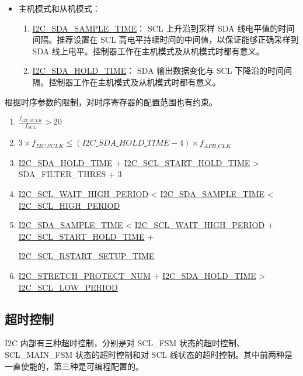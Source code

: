 \documentclass[main\_\_CN.tex]{subfiles}
\begin{document}
\begin{itemize}
\item 主机模式和从机模式：

\begin{enumerate}

\item \hyperref[fielddesc:I2CSDASAMPLETIME]{I2C\_SDA\_SAMPLE\_TIME}：
SCL 上升沿到采样 SDA 线电平值的时间间隔。推荐设置在 SCL 高电平持续时间的中间值，以保证能够正确采样到 SDA 线上电平。控制器工作在主机模式及从机模式时都有意义。

\item \hyperref[fielddesc:I2CSDAHOLDTIME]{I2C\_SDA\_HOLD\_TIME}：
SDA 输出数据变化与 SCL 下降沿的时间间隔。控制器工作在主机模式及从机模式时都有意义。

\end{enumerate}

\end{itemize}

根据时序参数的限制，对时序寄存器的配置范围也有约束。
\begin{enumerate}
\item $\frac{f_{I2C\_SCLK}}{f_{SCL}} > 20$
\item $3 \times f_{I2C\_SCLK} \leq (\hyperref[fielddesc:I2CSDAHOLDTIME]{I2C\_SDA\_HOLD\_TIME}-4) \times f_{APB\_CLK}$
\item \hyperref[fielddesc:I2CSDAHOLDTIME]{I2C\_SDA\_HOLD\_TIME} + \hyperref[fielddesc:I2CSCLSTARTHOLDTIME]{I2C\_SCL\_START\_HOLD\_TIME} > SDA\_FILTER\_THRES + 3
\item \hyperref[fielddesc:I2CSCLWAITHIGHPERIOD]{I2C\_SCL\_WAIT\_HIGH\_PERIOD} < \hyperref[fielddesc:I2CSDASAMPLETIME]{I2C\_SDA\_SAMPLE\_TIME} < \hyperref[fielddesc:I2CSCLHIGHPERIOD]{I2C\_SCL\_HIGH\_PERIOD}
\item \hyperref[fielddesc:I2CSDASAMPLETIME]{I2C\_SDA\_SAMPLE\_TIME} < \hyperref[fielddesc:I2CSCLWAITHIGHPERIOD]{I2C\_SCL\_WAIT\_HIGH\_PERIOD} + \hyperref[fielddesc:I2CSCLSTARTHOLDTIME]{I2C\_SCL\_START\_HOLD\_TIME} +

\hyperref[fielddesc:I2CSCLRSTARTSETUPTIME]{I2C\_SCL\_RSTART\_SETUP\_TIME}
\item \hyperref[fielddesc:I2CSTRETCHPROTECTNUM]{I2C\_STRETCH\_PROTECT\_NUM} + \hyperref[fielddesc:I2CSDAHOLDTIME]{I2C\_SDA\_HOLD\_TIME} > \hyperref[fielddesc:I2CSCLLOWPERIOD]{I2C\_SCL\_LOW\_PERIOD}
\end{enumerate}

\subsection{超时控制}
I2C 内部有三种超时控制，分别是对 SCL\_FSM 状态的超时控制、SCL\_MAIN\_FSM 状态的超时控制和对 SCL 线状态的超时控制。其中前两种是一直使能的，第三种是可编程配置的。
\end{document}
